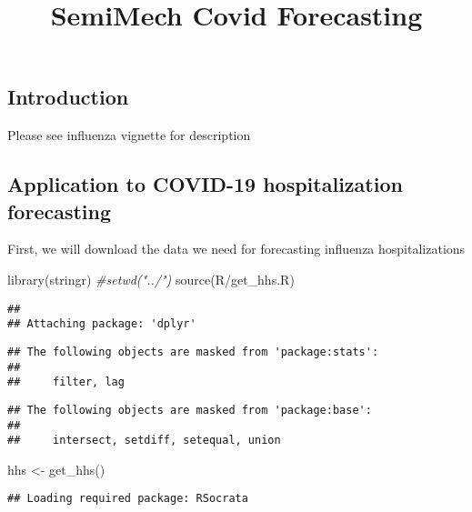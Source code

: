 \documentclass[
]{article}
\title{SemiMech Covid Forecasting}
\author{}
\date{\vspace{-2.5em}}
\newenvironment{Shaded}{\begin{snugshade}}{\end{snugshade}}
\newcommand{\CommentTok}[1]{\textcolor[rgb]{0.56,0.35,0.01}{\textit{#1}}}
\newcommand{\FunctionTok}[1]{\textcolor[rgb]{0.00,0.00,0.00}{#1}}
\newcommand{\NormalTok}[1]{#1}
\newcommand{\OtherTok}[1]{\textcolor[rgb]{0.56,0.35,0.01}{#1}}
\newcommand{\StringTok}[1]{\textcolor[rgb]{0.31,0.60,0.02}{#1}}
\begin{document}
\maketitle

\hypertarget{introduction}{%
\subsection{Introduction}\label{introduction}}

Please see influenza vignette for description

\hypertarget{application-to-covid-19-hospitalization-forecasting}{%
\subsection{Application to COVID-19 hospitalization
forecasting}\label{application-to-covid-19-hospitalization-forecasting}}

First, we will download the data we need for forecasting influenza
hospitalizations

\begin{Shaded}
\begin{Highlighting}[]
\FunctionTok{library}\NormalTok{(stringr)}
\CommentTok{\#setwd("../")}
\FunctionTok{source}\NormalTok{(}\StringTok{\textquotesingle{}R/get\_hhs.R\textquotesingle{}}\NormalTok{)}
\end{Highlighting}
\end{Shaded}

\begin{verbatim}
## 
## Attaching package: 'dplyr'
\end{verbatim}

\begin{verbatim}
## The following objects are masked from 'package:stats':
## 
##     filter, lag
\end{verbatim}

\begin{verbatim}
## The following objects are masked from 'package:base':
## 
##     intersect, setdiff, setequal, union
\end{verbatim}

\begin{Shaded}
\begin{Highlighting}[]
\NormalTok{hhs }\OtherTok{\textless{}{-}} \FunctionTok{get\_hhs}\NormalTok{()}
\end{Highlighting}
\end{Shaded}

\begin{verbatim}
## Loading required package: RSocrata
\end{verbatim}
\end{document}
